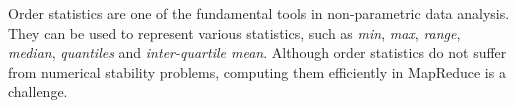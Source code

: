 


Order statistics are one of the fundamental tools in non-parametric data analysis. They can be used to represent various statistics, such as \textit{min}, \textit{max}, \textit{range}, \textit{median}, \textit{quantiles} and \textit{inter-quartile mean}. Although order statistics do not suffer from numerical stability problems, computing them efficiently in MapReduce is a challenge.

